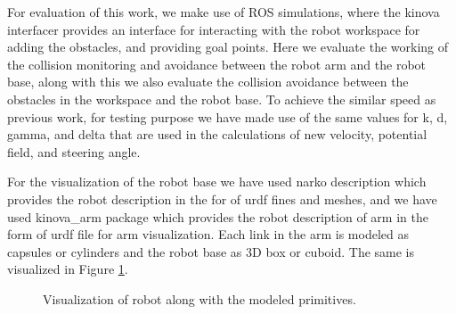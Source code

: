 \documentclass[a4paper, 11.5pt, conference]{ieeeconf}      %
\begin{document}
For evaluation of this work, we make use of ROS simulations, where the kinova interfacer provides an interface for interacting with the robot workspace for adding the obstacles, and providing goal points. Here we evaluate the working of the collision monitoring and avoidance between the robot arm and the robot base, along with this we also evaluate the collision avoidance between the obstacles in the workspace and the robot base. To achieve the similar speed as previous work, for testing purpose we have made use of the same values for k, d, gamma, and delta that are used in the calculations of new velocity, potential field, and steering angle.

For the visualization of the robot base we have used narko description which provides the robot description in the for of urdf fines and meshes, and we have used kinova\_arm package which provides the robot description of arm in the form of urdf file for arm visualization. Each link in the arm is modeled as capsules or cylinders and the robot base as 3D box or cuboid. The same is visualized in Figure \ref{fig:robot}.

\begin{figure}[H]
	\centering
	\caption{Visualization of robot along with the modeled primitives.}
	\label{fig:robot}
\end{figure}
\end{document}

